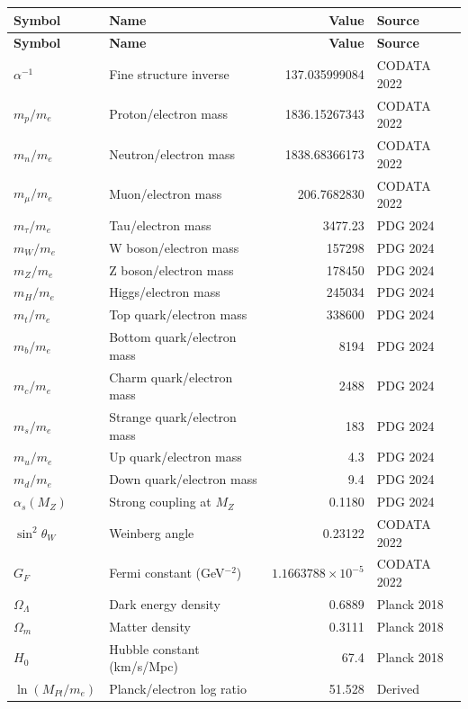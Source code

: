 \documentclass[11pt,a4paper]{article}
\begin{document}
\begin{longtable}{|l|l|r|l|}
\hline
\textbf{Symbol} & \textbf{Name} & \textbf{Value} & \textbf{Source} \\
\hline
\endfirsthead
\hline
\textbf{Symbol} & \textbf{Name} & \textbf{Value} & \textbf{Source} \\
\hline
\endhead
$\alpha^{-1}$ & Fine structure inverse & 137.035999084 & CODATA 2022 \\
$m_p/m_e$ & Proton/electron mass & 1836.15267343 & CODATA 2022 \\
$m_n/m_e$ & Neutron/electron mass & 1838.68366173 & CODATA 2022 \\
$m_\mu/m_e$ & Muon/electron mass & 206.7682830 & CODATA 2022 \\
$m_\tau/m_e$ & Tau/electron mass & 3477.23 & PDG 2024 \\
$m_W/m_e$ & W boson/electron mass & 157298 & PDG 2024 \\
$m_Z/m_e$ & Z boson/electron mass & 178450 & PDG 2024 \\
$m_H/m_e$ & Higgs/electron mass & 245034 & PDG 2024 \\
$m_t/m_e$ & Top quark/electron mass & 338600 & PDG 2024 \\
$m_b/m_e$ & Bottom quark/electron mass & 8194 & PDG 2024 \\
$m_c/m_e$ & Charm quark/electron mass & 2488 & PDG 2024 \\
$m_s/m_e$ & Strange quark/electron mass & 183 & PDG 2024 \\
$m_u/m_e$ & Up quark/electron mass & 4.3 & PDG 2024 \\
$m_d/m_e$ & Down quark/electron mass & 9.4 & PDG 2024 \\
$\alpha_s(M_Z)$ & Strong coupling at $M_Z$ & 0.1180 & PDG 2024 \\
$\sin^2\theta_W$ & Weinberg angle & 0.23122 & CODATA 2022 \\
$G_F$ & Fermi constant (GeV$^{-2}$) & $1.1663788 \times 10^{-5}$ & CODATA 2022 \\
$\Omega_\Lambda$ & Dark energy density & 0.6889 & Planck 2018 \\
$\Omega_m$ & Matter density & 0.3111 & Planck 2018 \\
$H_0$ & Hubble constant (km/s/Mpc) & 67.4 & Planck 2018 \\
$\ln(M_{Pl}/m_e)$ & Planck/electron log ratio & 51.528 & Derived \\
\hline
\end{longtable}

\end{document}
